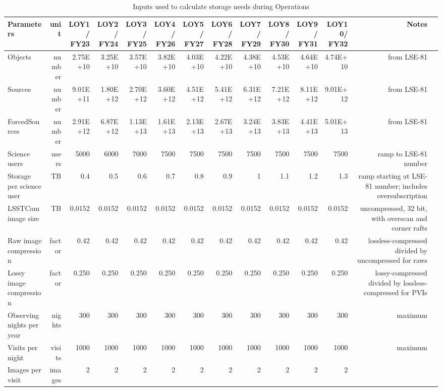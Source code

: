 \tiny \begin{longtable} { |p{}  |r  |r  |r  |r  |r  |r  |r  |r  |r  |r  |r  |r  |r |} 
\caption{Inputs used to calculate storage needs during Operations \label{tab:storageSizingOps}}\\ 
\hline 
\textbf{Parameters}&\textbf{unit}&\textbf{LOY1/ FY23}&\textbf{LOY2/ FY24}&\textbf{LOY3/ FY25}&\textbf{LOY4/ FY26}&\textbf{LOY5/ FY27}&\textbf{LOY6/ FY28}&\textbf{LOY7/ FY29}&\textbf{LOY8/ FY30}&\textbf{LOY9/ FY31}&\textbf{LOY10/ FY32}&\textbf{Notes} \\ \hline
{Objects}&{number}&{2.75E+10}&{3.25E+10}&{3.57E+10}&{3.82E+10}&{4.03E+10}&{4.22E+10}&{4.38E+10}&{4.53E+10}&{4.64E+10}&{4.74E+10}&{from LSE-81} \\ \hline
{Sources}&{number}&{9.01E+11}&{1.80E+12}&{2.70E+12}&{3.60E+12}&{4.51E+12}&{5.41E+12}&{6.31E+12}&{7.21E+12}&{8.11E+12}&{9.01E+12}&{from LSE-81} \\ \hline
{ForcedSources}&{number}&{2.91E+12}&{6.87E+12}&{1.13E+13}&{1.61E+13}&{2.13E+13}&{2.67E+13}&{3.24E+13}&{3.83E+13}&{4.41E+13}&{5.01E+13}&{from LSE-81} \\ \hline
{Science users}&{users}&{5000}&{6000}&{7000}&{7500}&{7500}&{7500}&{7500}&{7500}&{7500}&{7500}&{ramp to LSE-81 number} \\ \hline
{Storage per science user}&{TB}&{0.4}&{0.5}&{0.6}&{0.7}&{0.8}&{0.9}&{1}&{1.1}&{1.2}&{1.3}&{ramp starting at LSE-81 number; includes oversubscription} \\ \hline
{LSSTCam image size}&{TB}&{0.0152}&{0.0152}&{0.0152}&{0.0152}&{0.0152}&{0.0152}&{0.0152}&{0.0152}&{0.0152}&{0.0152}&{uncompressed, 32 bit, with overscan and corner rafts} \\ \hline
{Raw image compression}&{factor}&{0.42}&{0.42}&{0.42}&{0.42}&{0.42}&{0.42}&{0.42}&{0.42}&{0.42}&{0.42}&{lossless-compressed divided by uncompressed for raws} \\ \hline
{Lossy image compression}&{factor}&{0.250}&{0.250}&{0.250}&{0.250}&{0.250}&{0.250}&{0.250}&{0.250}&{0.250}&{0.250}&{lossy-compressed divided by lossless-compressed for PVIs} \\ \hline
{Observing nights per year}&{nights}&{300}&{300}&{300}&{300}&{300}&{300}&{300}&{300}&{300}&{300}&{maximum} \\ \hline
{Visits per night}&{visits}&{1000}&{1000}&{1000}&{1000}&{1000}&{1000}&{1000}&{1000}&{1000}&{1000}&{maximum} \\ \hline
{Images per visit}&{images}&{2}&{2}&{2}&{2}&{2}&{2}&{2}&{2}&{2}&{2}& \\ \hline

\end{longtable}
